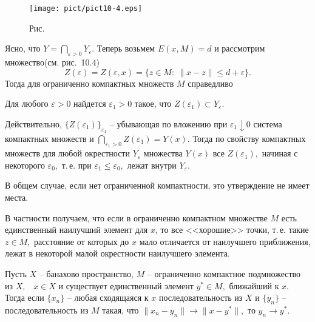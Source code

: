   \bigskip
\begin{figure}[ht]
\begin{center}
\texttt{[image: pict/pict10-4.eps]}
\end{center}
 \bigskip
 \label{r10-4}

 \centerline{Рис.~\theris}
 \bigskip
\end{figure}



 \noindent Ясно, что $Y=\bigcap\limits_{\varepsilon >0} Y_{\varepsilon}.$
 Теперь возьмем $E(x,M)=d$ и рассмотрим множество\linebreak (см. рис.~10.4)
 $$
 Z(\varepsilon)=Z(\varepsilon,x)=\{ z\in M:\ \|x-z\|\le d+\varepsilon\}.
 $$
 Тогда для ограниченно компактных множеств $M$ справедливо

 \begin{Proposition} %
 Для любого $\varepsilon>0$ найдется $\varepsilon_1>0$ такое, что
 $Z(\varepsilon_1)\subset Y_\varepsilon.$
 \end{Proposition}

 Действительно, {$\{Z(\varepsilon_1)\}_{\varepsilon_1}$} --
 убывающая по вложению при $\varepsilon_1\downarrow 0$
 система компактных множеств и $\bigcap\limits_{\varepsilon_1>0} Z(\varepsilon_1)=Y{(x)}.$
 Тогда по свойству компактных множеств для любой окрестности
 $Y_{\varepsilon}$  {множества $Y(x)$}
 все $Z(\varepsilon_1),$ начиная
 с некоторого $\varepsilon_0,$ т.\,е. при $\varepsilon_1\le \varepsilon_0,$
 лежат внутри $Y_{\varepsilon}.$

 В общем случае, если нет ограниченной компактности, это утверждение
 не имеет места.

 В частности получаем, что если
 {в ограниченно компактном множестве $M$}
 есть единственный
 наилучший элемент
{для $x$}, то все <<хорошие>> точки, т.\,е. такие $z\in M,$
 расстояние от которых до $x$
 мало отличается от наилучшего приближения, лежат
 в некоторой малой окрестности наилучшего элемента.

 \begin{teo}[о корректности] %
 Пусть $X$ -- банахово пространство, $M$ -- ограниченно компактное
 подмножество из $X,$~ $x\in X$ и существует единственный элемент
 $y^*\in M,$ ближайший к {$x.$} Тогда если $\{x_n\}$ -- любая сходящаяся
 к $x$ последовательность из $X$ и $\{y_n\}$ -- последовательность из
 $M$ такая, что $\|x_n-y_n\|\to \|x-y^*\|,$ то $y_n\to y^*.$
 \end{teo}

